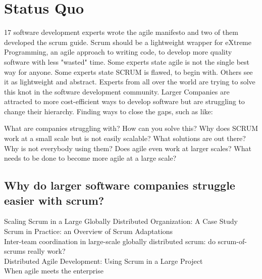 % 
\section*{Status Quo}

17 software development experts wrote the agile manifesto and two of them developed the scrum guide. Scrum should be a lightweight wrapper for eXtreme Programming, an agile approach to writing code, to develop more quality software with less "wasted" time. Some experts state agile is not the single best way for anyone. Some experts state SCRUM is flawed, to begin with. Others see it as lightweight and abstract. Experts from all over the world are trying to solve this knot in the software development community. Larger Companies are attracted to more cost-efficient ways to develop software but are struggling to change their hierarchy. Finding ways to close the gaps, such as like: 

What are companies struggling with? How can you solve this? Why does SCRUM work at a small scale but is not easily scalable? What solutions are out there? Why is not everybody using them? Does agile even work at larger scales? What needs to be done to become more agile at a large scale?

\subsection*{Why do larger software companies struggle easier with scrum?}

Scaling Scrum in a Large Globally Distributed Organization: A Case Study\citep{Paasivaara2016Ssi}\\
Scrum in Practice: an Overview of Scrum Adaptations\citep{Hron2018Sip}\\
Inter-team coordination in large-scale globally distributed scrum: do scrum-of-scrums really work?\citep{Paasivaara2012Itc}\\
Distributed Agile Development: Using Scrum in a Large Project\citep{Paasivaara2008Dad}\\
When agile meets the enterprise\citep{VanWaardenburg2013Wam}\\

